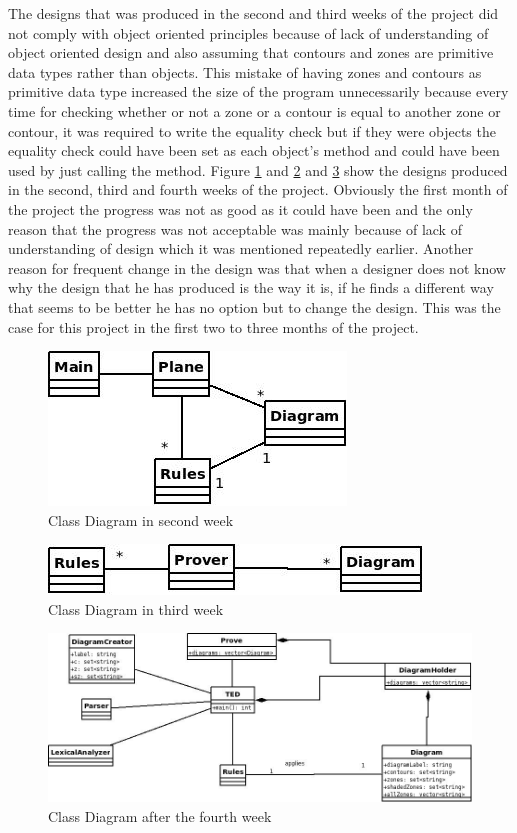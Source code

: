 \documentclass[10pt, a4paper, titlepage]{article}
\begin{document}
The designs that was produced in the second and third weeks of the project did not comply with object oriented principles because of lack of understanding of object oriented design and also assuming that contours and zones are primitive data types rather than objects. This mistake of having zones and contours as primitive data type increased the size of the program unnecessarily because every time for checking whether or not a zone or a contour is equal to another zone or contour, it was required to write the equality check but if they were objects the equality check could have been set as each object's method and could have been used by just calling the method. Figure \ref{2nd} and \ref{3rd} and \ref{4th} show the designs produced in the second, third and fourth weeks of the project. Obviously the first month of the project the progress was not as good as it could have been and the only reason that the progress was not acceptable was mainly because of lack of understanding of design which it was mentioned repeatedly earlier.  Another reason for frequent change in the design was that when a designer does not know why the design that he has produced is the way it is, if he finds a different way that seems to be better he has no option but to change the design. This was the case for this project in the first two to three months of the project.

\begin{figure}[h]
\centering
\includegraphics[scale=0.7]{images/2nd.jpeg}
\caption{Class Diagram in second week}
\label{2nd}
\end{figure}

\begin{figure}[h]
\centering
\includegraphics[scale=0.7]{images/3rd.jpeg}
\caption{Class Diagram in third week}
\label{3rd}
\end{figure}

\begin{figure}[h]
\centering
\includegraphics[scale=0.5]{images/4th.jpeg}
\caption{Class Diagram after the fourth week}
\label{4th}
\end{figure} 
\end{document}
